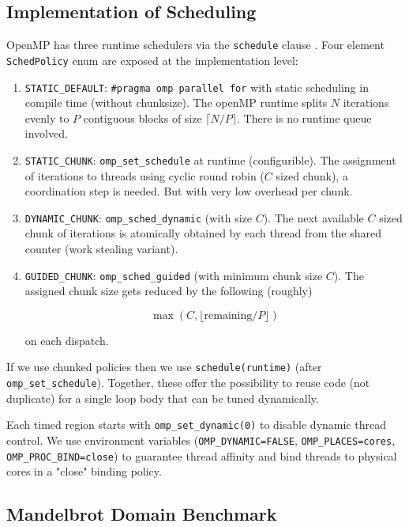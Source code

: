 \documentclass[conference]{IEEEtran}
\begin{document}
\subsection{Implementation of Scheduling}

OpenMP has three runtime schedulers via the \texttt{schedule} clause \cite{openmp2021spec52}. Four element \texttt{SchedPolicy} enum are exposed at the implementation level:

\begin{enumerate}
    \item \texttt{STATIC\_DEFAULT}: \texttt{\#pragma omp parallel for} with static scheduling in compile time (without chunksize). The openMP runtime splits $N$ iterations evenly to $P$ contiguous blocks of size $\lceil N/P \rceil$. There is no runtime queue involved.

    \item \texttt{STATIC\_CHUNK}: \texttt{omp\_set\_schedule} at runtime (configurible). The assignment of iterations to threads using cyclic round robin ($C$ sized chunk), a coordination step is needed. But with very low overhead per chunk.

    \item \texttt{DYNAMIC\_CHUNK}: \texttt{omp\_sched\_dynamic} (with size $C$). The next available $C$ sized chunk of iterations is atomically obtained by each thread from the shared counter (work stealing variant).

    \item \texttt{GUIDED\_CHUNK}: \texttt{omp\_sched\_guided} (with minimum chunk size $C$). The assigned chunk size gets reduced by the following (roughly)

    \[
    \max(C,\lfloor \text{remaining}/P\rfloor)
    \]

    on each dispatch.
\end{enumerate}

If we use chunked policies then we use \texttt{schedule(runtime)} (after \texttt{omp\_set\_schedule}). Together, these offer the possibility to reuse code (not duplicate) for a single loop body that can be tuned dynamically.

Each timed region starts with \texttt{omp\_set\_dynamic(0)} to disable dynamic thread control. We use environment variables (\texttt{OMP\_DYNAMIC=FALSE}, \texttt{OMP\_PLACES=cores}, \texttt{OMP\_PROC\_BIND=close}) to guarantee thread affinity and bind threads to physical cores in a "close" binding policy.

\subsection{Mandelbrot Domain Benchmark}
\end{document}
